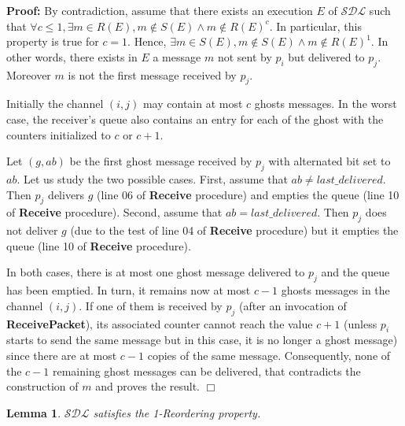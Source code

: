 \documentclass[11pt]{article}
\newtheorem{lemma}{Lemma}
\newenvironment{proof}{\noindent\textbf{Proof:}}{\hfill$\Box$}
\begin{document}
\begin{proof}
By contradiction, assume that there exists an execution $E$ of $\mathcal{SDL}$ such that $\forall c\leq 1, \exists m\in R(E), m\notin S(E) \wedge m\notin R(E)^c$. In particular, this property is true for $c=1$. Hence, $\exists m\in S(E), m\notin S(E)\wedge m\notin R(E)^1$. In other words, there exists in $E$ a message $m$ not sent by $p_i$ but delivered to $p_j$. Moreover $m$ is not the first message received by $p_j$.

Initially the channel $(i,j)$ may contain at most $c$ ghosts messages. In the worst case, the receiver's queue also contains an entry for each of the ghost with the counters initialized to $c$ or $c+1$.

Let $(g,ab)$ be the first ghost message received by $p_j$ with alternated bit set to $ab$. Let us study the two possible cases. First, assume that $ab \neq last\_delivered$. Then $p_j$ delivers $g$ (line 06 of \textbf{Receive} procedure) and empties the queue (line 10 of \textbf{Receive} procedure). Second, assume that $ab = last\_delivered$. Then $p_j$ does not deliver $g$ (due to the test of line 04 of \textbf{Receive} procedure) but it empties the queue (line 10 of \textbf{Receive} procedure).

In both cases, there is at most one ghost message delivered to $p_j$ and the queue has been emptied. In turn, it remains now at most $c-1$ ghosts messages in the channel $(i,j)$. If one of them is received by $p_j$ (after an invocation of \textbf{ReceivePacket}), its associated counter cannot reach the value $c+1$ (unless $p_i$ starts to send the same message but in this case, it is no longer a ghost message) since there are at most $c-1$ copies of the same message. Consequently, none of the $c-1$ remaining ghost messages can be delivered, that contradicts the construction of $m$ and proves the result.  
\end{proof}

\begin{lemma}\label{lem:reordering}
$\mathcal{SDL}$ satisfies the 1-Reordering property.
\end{lemma}
\end{document}

